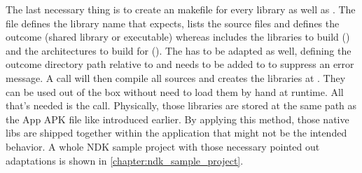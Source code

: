 The last necessary thing is to create an  makefile for every library as well as . The  file defines the library name that  expects, lists the source files and defines the outcome (shared library or executable) whereas  includes
the libraries to build () and the architectures to build for
(). The  has to be adapted as well, defining the
outcome directory path relative to  and  needs to be added to  to suppress an error message.
A  call will then compile all sources and creates the libraries
at . They can be used out of the box without need to load them by hand
at runtime. All that's needed is the  call. Physically, those libraries are stored at the same path as the App APK file like introduced earlier. By applying this method, those native libs are shipped together within the application that might not be the intended behavior. A whole NDK sample project with those necessary
pointed out adaptations is shown in \autoref{chapter:ndk_sample_project}.

